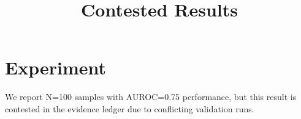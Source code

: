 \documentclass{article}
\title{Contested Results}
\begin{document}
\section{Experiment}

We report N=100 samples with AUROC=0.75 performance,
but this result is contested in the evidence ledger
due to conflicting validation runs.
\end{document}
